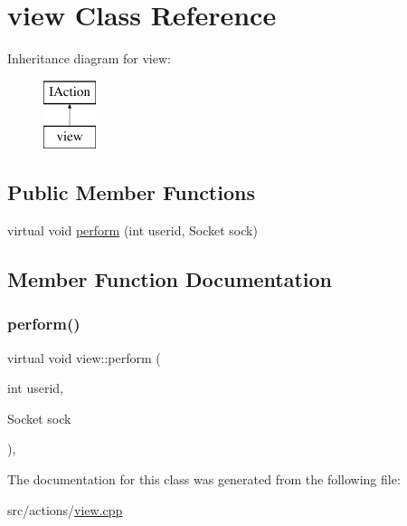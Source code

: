 \hypertarget{classview}{}\section{view Class Reference}
\label{classview}
Inheritance diagram for view\+:\begin{figure}[H]
\begin{center}
\leavevmode
\includegraphics[height=2.000000cm]{classview}
\end{center}
\end{figure}
\subsection*{Public Member Functions}
\begin{DoxyCompactItemize}
\item 
virtual void \mbox{\hyperlink{classview_afff29fcfad8be5de1bc6522722357ffa}{perform}} (int userid, Socket sock)
\end{DoxyCompactItemize}


\subsection{Member Function Documentation}
\mbox{\label{classview_afff29fcfad8be5de1bc6522722357ffa}} 
\subsubsection{\texorpdfstring{perform()}{perform()}}
{\footnotesize\ttfamily virtual void view\+::perform (\begin{DoxyParamCaption}\item[{int}]{userid,  }\item[{Socket}]{sock }\end{DoxyParamCaption})\hspace{0.3cm}{\ttfamily [inline]}, {\ttfamily [virtual]}}



The documentation for this class was generated from the following file\+:\begin{DoxyCompactItemize}
\item 
src/actions/\mbox{\hyperlink{view_8cpp}{view.\+cpp}}\end{DoxyCompactItemize}
